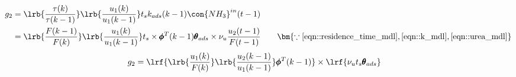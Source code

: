 \begin{align*}
        g_2 &= \lrb{\frac{\tau(k)}{\tau(k-1)}}
                                \lrb{\frac{u_1(k)}{u_1(k-1)}}
                t_s k_{ads}(k-1) \con{NH_3}^{in}(t-1)\\
        &=\lrb{\frac{F(k-1)}{F(k)}}\lrb{\frac{u_1(k)}{u_1(k-1)}}
                t_s \times \pmb \phi^T(k-1) \pmb \theta_{ads} \times \nu_u \frac{u_2(t-1)}{F(t-1)}
                \qquad
                \bm{\because \ref{eqn::residence_time_mdl}, \ref{eqn::k_mdl}, \ref{eqn::urea_mdl}}
\end{align*}
\begin{align}
       g_2 &=  \lrf{\lrb{\frac{u_1(k)}{F(k)}}\lrb{\frac{u_2(k-1)}{u_1(k-1)}} \pmb \phi^T(k-1) }
                \times \lrf{\nu_u t_s \pmb \theta_{ads}}
\end{align}
